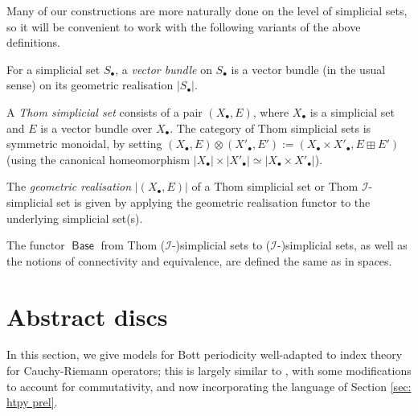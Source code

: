 \documentclass{TPmod}
\DeclareMathOperator{\Base}{\mathsf{Base}}
\newcommand{\cI}{\mathcal{I}}
\renewcommand{\cong}{\simeq}
\numberwithin{equation}{section}
\begin{document}
    Many of our constructions are more naturally done on the level of simplicial sets, so it will be convenient to work with the following variants of the above definitions.
    \begin{defn}
        For a simplicial set $S_\bullet$, a \emph{vector bundle} on $S_\bullet$ is a vector bundle (in the usual sense) on its geometric realisation $|S_\bullet|$.
    \end{defn}
    \begin{defn}
        A \emph{Thom simplicial set} consists of a pair $(X_\bullet, E)$, where $X_\bullet$ is a simplicial set and $E$ is a vector bundle over $X_\bullet$. The category of Thom simplicial sets is symmetric monoidal, by setting $(X_\bullet, E) \otimes (X'_\bullet, E') := (X_\bullet \times X'_\bullet, E \boxplus E')$ (using the canonical homeomorphism $|X_\bullet| \times |X'_\bullet| \cong |X_\bullet \times X'_\bullet|$).

        

        The \emph{geometric realisation} $|(X_\bullet,E)|$ of a Thom simplicial set or Thom $\cI$-simplicial set is given by applying the geometric realisation functor to the underlying simplicial set(s).
    \end{defn}
    The functor $\Base$ from Thom ($\cI$-)simplicial sets to ($\cI$-)simplicial sets, as well as the notions of connectivity and equivalence, are defined the same as in spaces.


\section{Abstract discs\label{sec:abstract discs}}

    In this section, we give models for Bott periodicity well-adapted to index theory for Cauchy-Riemann operators; this is largely similar to \cite[Section 3]{PS2}, with some modifications to account for commutativity, and now incorporating the language of Section \ref{sec: htpy prel}. 
\end{document}

